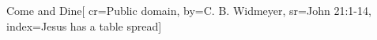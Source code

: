 {Come and Dine}[
    cr={Public domain},
    by={C. B. Widmeyer},
    sr={John 21:1-14},
    index={Jesus has a table spread}]

